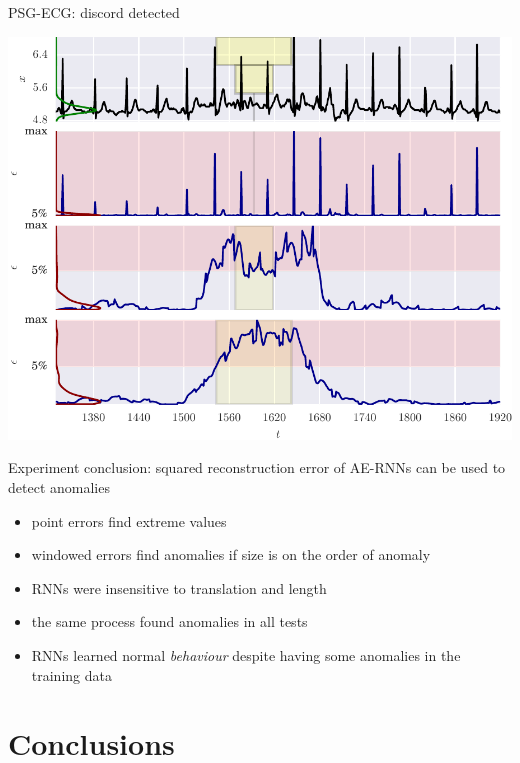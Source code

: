 \documentclass{beamer}
\begin{document}
    \begin{frame}{PSG-ECG: discord detected}

      \includegraphics[width=\textwidth]{figs/er_sleep.pdf}

    \end{frame}



    \begin{frame}{Experiment conclusion: squared reconstruction error of AE-RNNs can be used to detect anomalies}

      \begin{itemize}
        \item point errors find extreme values
        \item windowed errors find anomalies if size is on the order of anomaly
        \item RNNs were insensitive to translation and length
        \item the same process found anomalies in all tests
        \item RNNs learned normal \emph{behaviour} despite having some anomalies in the training data
      \end{itemize}

    \end{frame}


    \section{Conclusions}
\end{document}
